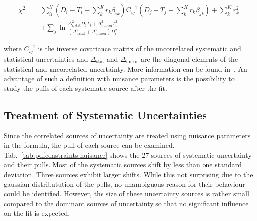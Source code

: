 \begin{align*}
  \chi^2 = &\sum_{ij}^N \left(D_i - T_i - \sum_k^K r_k \beta_{ik}\right) \mathrm{C}_{ij}^{-1}
  \left(D_j - T_j - \sum_k^K r_k \beta_{jk} \right) + \sum_k^K r_k^2\\
  &+ \sum_j \ln \frac{\Delta_{i,\mathrm{stat}}^2 D_j T_j + \Delta_{i,\mathrm{uncor}}^2 T_i^2}{\left( \Delta_{i,\mathrm{stat}}^2 + \Delta_{i,\mathrm{uncor}}^2 \right) D_i^2}
  \label{chi2_nuisance}
\end{align*}

where $C_{ij}^{-1}$ is the inverse covariance matrix of the uncorrelated
systematic and statistical uncertainties and $\Delta_\mathrm{stat}$ and
$\Delta_\mathrm{uncor}$ are the diagonal elements of the statistical and
uncorrelated uncertainty. More information can be found
in~\cite{Alekhin:2014irh,Abramowicz:2015mha}. An advantage of such a \chisq
definition with nuisance parameters is the possibility to study the pulls of
each systematic source after the fit.

\subsection{Treatment of Systematic Uncertainties}
\label{section:cmsdatauncertainties}

%
Since the correlated sources of uncertainty are treated using nuisance
parameters in the \chisq formula, the pull of each source can be examined.
Tab.~\ref{tab:pdfconstraints:nuisance} shows the 27 sources of systematic
uncertainty and their pulls. Most of the systematic sources shift by less than
one standard deviation. Three sources exhibit larger shifts. While this not
surprising due to the gaussian distributution of the pulls, no unambiguous
reason for their behaviour could be identified. However, the size of these
uncertainty sources is rather small compared to the dominant sources of
uncertainty so that no significant influence on the fit is expected.

